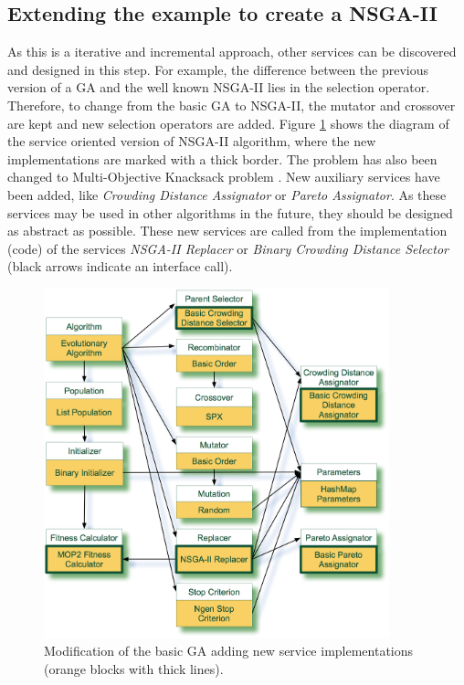 \subsection{Extending the example to create a NSGA-II}

As this is a iterative and incremental approach, other services can be discovered and designed in this step. For example, the difference between the previous version of a GA and the well known NSGA-II \cite{NSGA2} lies in the selection operator. Therefore, to change from the basic GA to NSGA-II, the mutator and crossover are kept and new selection operators are added. Figure \ref{fig:nsga2} shows the diagram of the service oriented version of NSGA-II algorithm, where the new implementations are marked with a thick border. The problem has also been changed to Multi-Objective Knacksack problem \cite{MULTIOBJECTIVEKNACKSACK}. New auxiliary services have been added, like {\em Crowding Distance Assignator} or {\em Pareto Assignator}. As these services may be used in other algorithms in the future, they should be designed as abstract as possible. These new services are called from the implementation (code) of the services {\em NSGA-II Replacer} or {\em Binary Crowding Distance Selector} (black arrows indicate an interface call). 




\begin{figure}
\centering
\includegraphics[width=10cm]{gfx/soaea/nsga2.jpg}
\caption{Modification of the basic GA adding new service implementations (orange blocks with thick lines).}
\label{fig:nsga2}
\end{figure}



